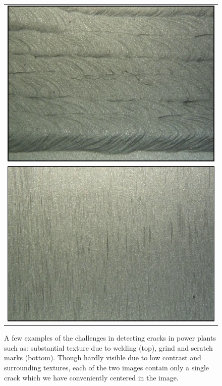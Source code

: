     \begin{figure} [ht]
    
        \begin{centering}
        \begin{tabular}{c}
            \includegraphics[width=0.8\columnwidth]{Images/WeldingCrack2.png} \\
            \includegraphics[width=0.8\columnwidth]{Images/ScratchCrack2.png}
        \end{tabular}
        
        \caption{A few examples of the challenges in detecting cracks in power plants such as: substantial texture due to welding (top), grind and scratch marks (bottom). Though hardly visible due to low contrast and surrounding textures, each of the two images contain only a single crack which we have conveniently centered in the image.}
        \label{challenges}
        \end{centering} 
    \end{figure}
    
